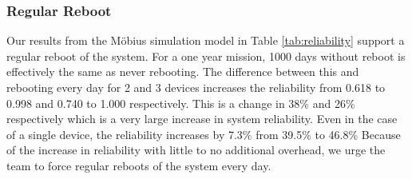 \subsubsection{Regular Reboot} Our results from the M\"obius simulation model
in Table \ref{tab:reliability} support a regular reboot of the system. For a one year
mission, 1000 days without reboot is effectively the same as never rebooting. The
difference between this and rebooting every day for 2 and 3 devices increases the
reliability from 0.618 to 0.998 and 0.740 to 1.000 respectively. This is a change in
38\% and 26\% respectively which is a very large increase in system reliability. 
Even in the case of a single device, the reliability increases by 7.3\% from 39.5\%
to 46.8\% Because of the increase in reliability with little to no additional overhead, 
we urge the team to force regular reboots of the system every day.
